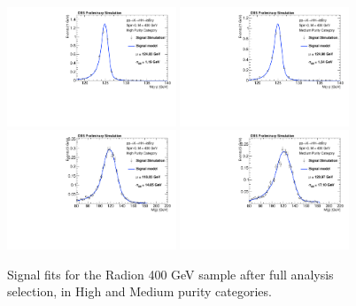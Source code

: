 \begin{figure}[thb]
  \centering
  \includegraphics[width=0.45\textwidth]{figures/sec-signals/Rad400_signal_fit_mgg_cat0}\hfil
  \includegraphics[width=0.45\textwidth]{figures/sec-signals/Rad400_signal_fit_mgg_cat1}\hfil
  \includegraphics[width=0.45\textwidth]{figures/sec-signals/Rad400_signal_fit_mjj_cat0}\hfil
  \includegraphics[width=0.45\textwidth]{figures/sec-signals/Rad400_signal_fit_mjj_cat1}\hfil
  \caption{Signal fits for the Radion 400 GeV sample after full analysis selection, in High and Medium purity categories.}
  \label{fig:rad400}
\end{figure}


